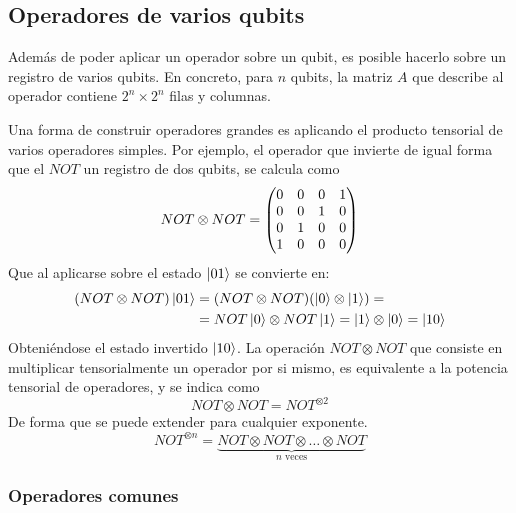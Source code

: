 \subsection{Operadores de varios qubits}

Además de poder aplicar un operador sobre un qubit, es posible hacerlo sobre un 
registro de varios qubits. En concreto, para $n$ qubits, la matriz $A$ que 
describe al operador contiene $2^n \times 2^n$ filas y columnas.

Una forma de construir operadores grandes es aplicando el producto tensorial de 
varios operadores simples. Por ejemplo, el operador que invierte de igual forma 
que el $NOT$ un registro de dos qubits, se calcula como
%
$$ NOT \otimes NOT = \begin{pmatrix} 0&0&0&1\\ 0&0&1&0 \\ 0&1&0&0 \\ 1&0&0&0 \end{pmatrix}$$
%
Que al aplicarse sobre el estado $\ket{01}$ se convierte en:
%
\begin{equation*}
\begin{split}
(NOT \otimes NOT) \ket{01} &= (NOT \otimes NOT) (\ket{0} \otimes \ket{1}) =\\
& = NOT \ket{0} \otimes NOT \ket{1} = \ket{1} \otimes \ket{0} = \ket{10}
\end{split}
\end{equation*}
%
Obteniéndose el estado invertido $\ket{10}$. La operación $NOT \otimes NOT$ que 
consiste en multiplicar tensorialmente un operador por si mismo, es equivalente 
a la potencia tensorial de operadores, y se indica como
%
$$ NOT \otimes NOT = NOT^{\otimes 2} $$
%
De forma que se puede extender para cualquier exponente.
%
$$ NOT^{\otimes n} = \underbrace{NOT\otimes NOT\otimes \ldots \otimes NOT}_{n 
\text{ veces}}$$
%

\subsubsection{Operadores comunes}

